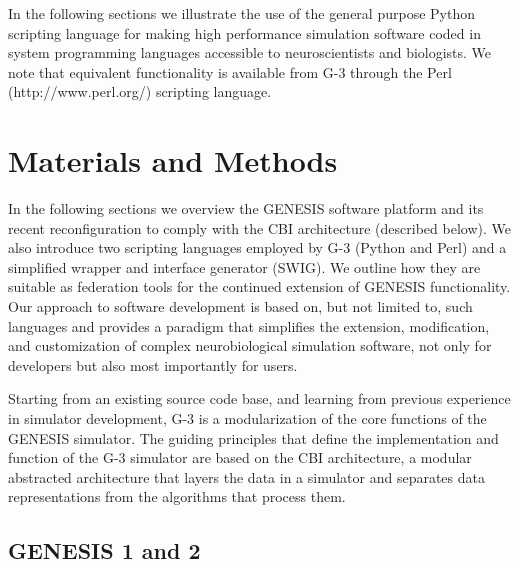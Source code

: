 \documentclass[10pt]{article}
\begin{document}
In the following sections we illustrate the use of the general purpose Python scripting
language for making high performance simulation software coded in
system programming languages accessible to neuroscientists and
biologists. We note that equivalent functionality is available from G-3 through the Perl (http://www.perl.org/) scripting language. 

\section*{\LARGE Materials and Methods}

In the following sections we overview the GENESIS software platform
and its recent reconfiguration to comply with the CBI architecture
(described below). We also introduce two scripting languages employed
by G-3 (Python and Perl) and a simplified wrapper and interface
generator (SWIG). We outline how they are suitable as federation tools
for the continued extension of GENESIS functionality. Our approach to
software development is based on, but not limited to, such languages
and provides a paradigm that simplifies the extension, modification,
and customization of complex neurobiological simulation software, not
only for developers but also most importantly for users.

Starting from an existing source code base, and learning from
previous experience in simulator development, G-3 is a modularization of the core functions of the GENESIS
simulator.  The guiding principles that define the implementation and
function of the G-3 simulator are based on the CBI
architecture, a modular abstracted architecture
that layers the data in a simulator and separates data
representations from the algorithms that process them.

\subsection*{GENESIS 1 and 2}
\label{sec:genesis}

\end{document}
